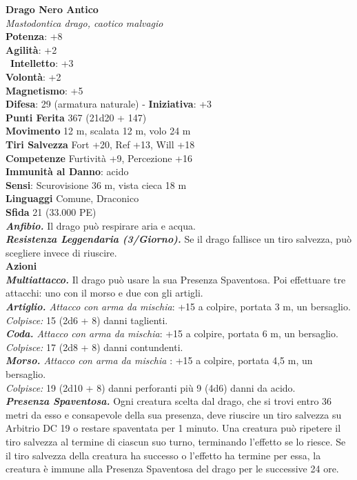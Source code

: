 \begin{multicols}{2}
\medskip\textbf{Drago Nero Antico}\\
\emph{Mastodontica drago, caotico malvagio}\\
\textbf{Potenza}: +8\\
\textbf{Agilità}: +2\\\
\textbf{Intelletto}: +3\\
\textbf{Volontà}: +2\\
\textbf{Magnetismo}: +5\\
\textbf{Difesa}: 29 (armatura naturale) - \textbf{Iniziativa}: +3\\
\textbf{Punti Ferita} 367 (21d20 + 147)\\
\textbf{Movimento} 12 m, scalata 12 m, volo 24 m\\
\textbf{Tiri Salvezza} Fort +20, Ref +13, Will +18\\
\textbf{Competenze} Furtività +9, Percezione +16\\
\textbf{Immunità al Danno}: acido\\
\textbf{Sensi}: Scurovisione 36 m, vista cieca 18 m\\
\textbf{Linguaggi} Comune, Draconico\\
\textbf{Sfida} 21 (33.000 PE)\smallskip\\
\emph{\textbf{Anfibio.}} Il drago può respirare aria e acqua.\\
\emph{\textbf{Resistenza Leggendaria (3/Giorno).}} Se il drago fallisce un tiro salvezza, può scegliere invece di riuscire.\\
\smallskip\textbf{Azioni}\\
\emph{\textbf{Multiattacco.}} Il drago può usare la sua Presenza Spaventosa. Poi effettuare tre attacchi: uno con il morso e due con gli artigli.\\
\emph{\textbf{Artiglio.} Attacco con arma da mischia}: +15 a colpire, portata 3 m, un bersaglio.\\
\emph{Colpisce:} 15 (2d6 + 8) danni taglienti.\\
\emph{\textbf{Coda.} Attacco con arma da mischia}: +15 a colpire, portata 6 m, un bersaglio.\\
\emph{Colpisce:} 17 (2d8 + 8) danni contundenti.\\
\emph{\textbf{Morso.} Attacco con arma da mischia} : +15 a colpire, portata 4,5 m, un bersaglio.\\
\emph{Colpisce:} 19 (2d10 + 8) danni perforanti più 9 (4d6) danni da acido.\\
\emph{\textbf{Presenza Spaventosa.}} Ogni creatura scelta dal drago, che si trovi entro 36 metri da esso e consapevole della sua presenza, deve riuscire un tiro salvezza su Arbitrio DC 19 o restare spaventata per 1 minuto. Una creatura può ripetere il tiro salvezza al termine di ciascun suo turno, terminando l'effetto se lo riesce. Se il tiro salvezza della creatura ha successo o l'effetto ha termine per essa, la creatura è immune alla Presenza Spaventosa del drago per le successive 24 ore.\\

\end{multicols}
